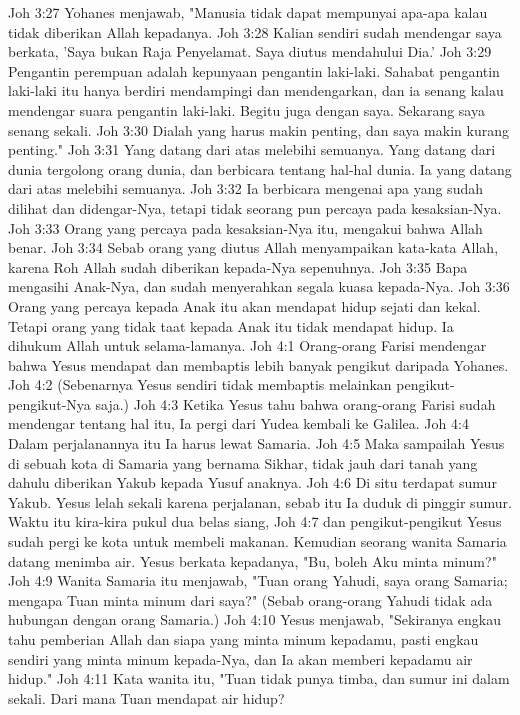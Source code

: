 Joh 3:27  Yohanes menjawab, "Manusia tidak dapat mempunyai apa-apa kalau tidak diberikan Allah kepadanya.
Joh 3:28  Kalian sendiri sudah mendengar saya berkata, 'Saya bukan Raja Penyelamat. Saya diutus mendahului Dia.'
Joh 3:29  Pengantin perempuan adalah kepunyaan pengantin laki-laki. Sahabat pengantin laki-laki itu hanya berdiri mendampingi dan mendengarkan, dan ia senang kalau mendengar suara pengantin laki-laki. Begitu juga dengan saya. Sekarang saya senang sekali.
Joh 3:30  Dialah yang harus makin penting, dan saya makin kurang penting."
Joh 3:31  Yang datang dari atas melebihi semuanya. Yang datang dari dunia tergolong orang dunia, dan berbicara tentang hal-hal dunia. Ia yang datang dari atas melebihi semuanya.
Joh 3:32  Ia berbicara mengenai apa yang sudah dilihat dan didengar-Nya, tetapi tidak seorang pun percaya pada kesaksian-Nya.
Joh 3:33  Orang yang percaya pada kesaksian-Nya itu, mengakui bahwa Allah benar.
Joh 3:34  Sebab orang yang diutus Allah menyampaikan kata-kata Allah, karena Roh Allah sudah diberikan kepada-Nya sepenuhnya.
Joh 3:35  Bapa mengasihi Anak-Nya, dan sudah menyerahkan segala kuasa kepada-Nya.
Joh 3:36  Orang yang percaya kepada Anak itu akan mendapat hidup sejati dan kekal. Tetapi orang yang tidak taat kepada Anak itu tidak mendapat hidup. Ia dihukum Allah untuk selama-lamanya.
Joh 4:1  Orang-orang Farisi mendengar bahwa Yesus mendapat dan membaptis lebih banyak pengikut daripada Yohanes.
Joh 4:2  (Sebenarnya Yesus sendiri tidak membaptis melainkan pengikut-pengikut-Nya saja.)
Joh 4:3  Ketika Yesus tahu bahwa orang-orang Farisi sudah mendengar tentang hal itu, Ia pergi dari Yudea kembali ke Galilea.
Joh 4:4  Dalam perjalanannya itu Ia harus lewat Samaria.
Joh 4:5  Maka sampailah Yesus di sebuah kota di Samaria yang bernama Sikhar, tidak jauh dari tanah yang dahulu diberikan Yakub kepada Yusuf anaknya.
Joh 4:6  Di situ terdapat sumur Yakub. Yesus lelah sekali karena perjalanan, sebab itu Ia duduk di pinggir sumur. Waktu itu kira-kira pukul dua belas siang,
Joh 4:7  dan pengikut-pengikut Yesus sudah pergi ke kota untuk membeli makanan. Kemudian seorang wanita Samaria datang menimba air. Yesus berkata kepadanya, "Bu, boleh Aku minta minum?"
Joh 4:9  Wanita Samaria itu menjawab, "Tuan orang Yahudi, saya orang Samaria; mengapa Tuan minta minum dari saya?" (Sebab orang-orang Yahudi tidak ada hubungan dengan orang Samaria.)
Joh 4:10  Yesus menjawab, "Sekiranya engkau tahu pemberian Allah dan siapa yang minta minum kepadamu, pasti engkau sendiri yang minta minum kepada-Nya, dan Ia akan memberi kepadamu air hidup."
Joh 4:11  Kata wanita itu, "Tuan tidak punya timba, dan sumur ini dalam sekali. Dari mana Tuan mendapat air hidup?
